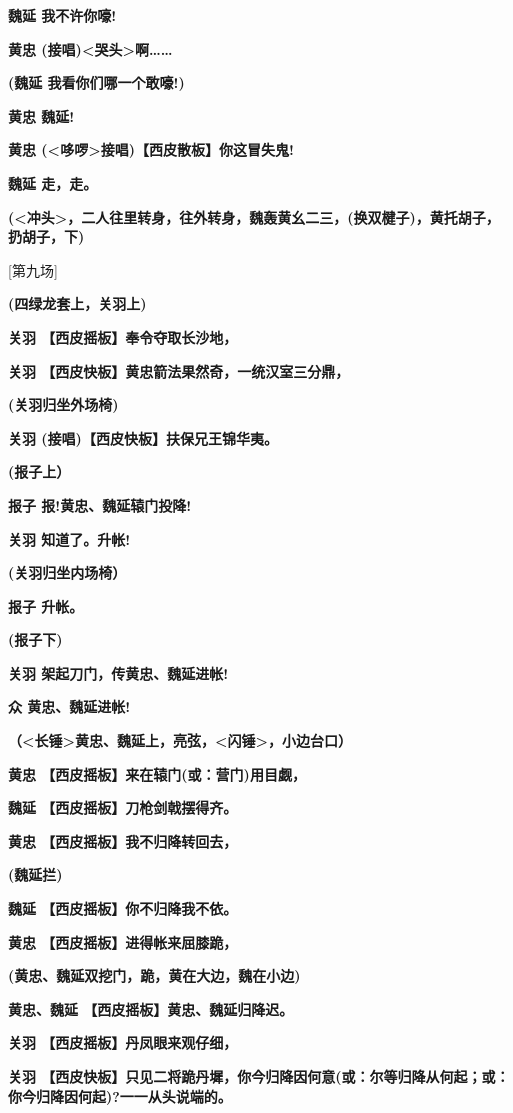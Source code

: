 \textbf{魏延 我不许你嚎!}

\textbf{黄忠 (接唱)\textless{}哭头\textgreater{}啊\ldots{}\ldots{}}

\textbf{(魏延 我看你们哪一个敢嚎!)}

\textbf{黄忠 魏延!}

\textbf{黄忠 (\textless{}哆啰\textgreater{}接唱)【西皮散板】你这冒失鬼!}

\textbf{魏延 走，走。}

\textbf{(\textless{}冲头\textgreater{}，二人往里转身，往外转身，魏轰黄幺二三，(换双楗子)，黄托胡子，扔胡子，下)}

{[}第九场{]}

\textbf{(四绿龙套上，关羽上)}

\textbf{关羽 【西皮摇板】奉令夺取长沙地，}

\textbf{关羽 【西皮快板】黄忠箭法果然奇，一统汉室三分鼎，}

\textbf{(关羽归坐外场椅)}

\textbf{关羽 (接唱)【西皮快板】扶保兄王锦华夷。}

\textbf{(报子上）}

\textbf{报子 报!黄忠、魏延辕门投降!}

\textbf{关羽 知道了。升帐!}

\textbf{(关羽归坐内场椅）}

\textbf{报子 升帐。}

\textbf{(报子下)}

\textbf{关羽 架起刀门，传黄忠、魏延进帐!}

\textbf{众 黄忠、魏延进帐!}

\textbf{（\textless{}长锤\textgreater{}黄忠、魏延上，亮弦，\textless{}闪锤\textgreater{}，小边台口）}

\textbf{黄忠 【西皮摇板】来在辕门(或：营门)用目觑，}

\textbf{魏延 【西皮摇板】刀枪剑戟摆得齐。}

\textbf{黄忠 【西皮摇板】我不归降转回去，}

\textbf{(魏延拦)}

\textbf{魏延 【西皮摇板】你不归降我不依。}

\textbf{黄忠 【西皮摇板】进得帐来屈膝跪，}

\textbf{(黄忠、魏延双挖门，跪，黄在大边，魏在小边)}

\textbf{黄忠、魏延 【西皮摇板】黄忠、魏延归降迟。}

\textbf{关羽 【西皮摇板】丹凤眼来观仔细，}

\textbf{关羽
【西皮快板】只见二将跪丹墀，你今归降因何意(或：尔等归降从何起；或：你今归降因何起)?一一从头说端的。}

